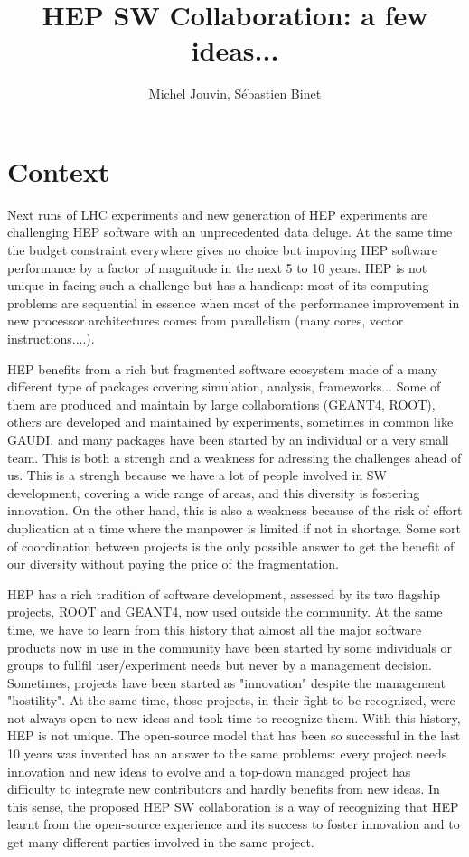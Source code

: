 \documentclass[11pt]{article} %
\title{HEP SW Collaboration: a few ideas...}
\author{Michel Jouvin, Sébastien Binet}
\begin{document}
\maketitle

\section{Context}

Next runs of LHC experiments and new generation of HEP experiments are challenging HEP software with an unprecedented data deluge. At the same time the budget constraint everywhere gives no choice but impoving HEP software performance by a factor of magnitude in the next 5 to 10 years. HEP is not unique in facing such a challenge but has a handicap: most of its computing problems are sequential in essence when most of the performance improvement in new processor architectures comes from parallelism (many cores, vector instructions....).

HEP benefits from a rich but fragmented software ecosystem made of a many different type of packages covering simulation, analysis, frameworks... Some of them are produced and maintain by large collaborations (GEANT4, ROOT), others are developed and maintained by experiments, sometimes in common like GAUDI, and many packages have been started by an individual or a very small team. This is both a strengh and a weakness for adressing the challenges ahead of us. This is a strengh because we have a lot of people involved in SW development, covering a wide range of areas, and this diversity is fostering innovation. On the other hand, this is also a weakness because of the risk of effort duplication at a time where the manpower is limited if not in shortage. Some sort of coordination between projects is the only possible answer to get the benefit of our diversity without paying the price of the fragmentation.

HEP has a rich tradition of software development, assessed by its two flagship projects, ROOT and GEANT4, now used outside the community. At the same time, we have to learn from this history that almost all the major software products now in use in the community have been started by some individuals or groups to fullfil user/experiment needs but never by a management decision. Sometimes, projects have been started as "innovation" despite the management "hostility". At the same time, those projects, in their fight to be recognized, were not always open to new ideas and took time to recognize them. With this history, HEP is not unique. The open-source model that has been so successful in the last 10 years was invented has an answer to the same problems: every project needs innovation and new ideas to evolve and a top-down managed project has difficulty to integrate new contributors and hardly benefits from new ideas. In this sense, the proposed HEP SW collaboration is a way of recognizing that HEP learnt from the open-source experience and its success to foster innovation and to get many different parties involved in the same project.
\end{document}
